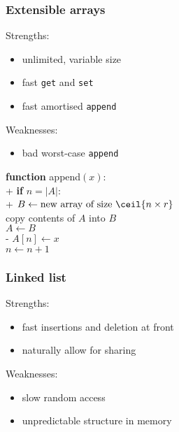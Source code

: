 \documentclass{article}
\begin{document}
\subsubsection{Extensible arrays}

\begin{multicols}{2}


	\noindent Strengths:
	\begin{itemize}
		\item unlimited, variable size
		\item fast \texttt{get} and \texttt{set}
		\item fast amortised \texttt{append}
	\end{itemize}

	\noindent Weaknesses:
	\begin{itemize}
		\item bad worst-case \texttt{append}
	\end{itemize}

	\begin{pseudo}
		\textbf{function} \textsf{append}$(x)$:												\\+
		\textbf{if} $n=|A|$:																\\+
		$B \leftarrow \text{new array of size }\ceil{n\times r}$						\\
		copy contents of $A$ into $B$													\\
		$A\leftarrow B$																	\\-
		$A[n]\leftarrow x$																\\
		$n\leftarrow n + 1$
	\end{pseudo}
\end{multicols}



\subsubsection{Linked list}

Strengths:
\begin{itemize}
	\item fast insertions and deletion at front
	\item naturally allow for sharing
\end{itemize}

Weaknesses:
\begin{itemize}
	\item slow random access
	\item unpredictable structure in memory
\end{itemize}
\end{document}
